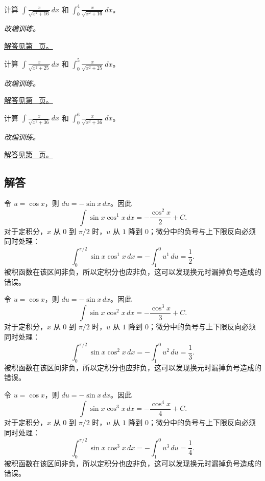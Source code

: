 \documentclass[12pt,fontset=fandol]{ctexart}
\begin{document}
\begin{example}[双曲型根式的直接代换]\label{ex:c14q22}
计算 $\displaystyle\int\frac{x}{\sqrt{x^2+16}}\,dx$ 和 $\displaystyle\int_0^{4}\frac{x}{\sqrt{x^2+16}}\,dx$。
\par\textit{改编训练。}\par\hyperref[ans:c14q22]{解答见第~\pageref{ans:c14q22} 页。}
\end{example}
\begin{example}[双曲型根式的直接代换]\label{ex:c14q23}
计算 $\displaystyle\int\frac{x}{\sqrt{x^2+25}}\,dx$ 和 $\displaystyle\int_0^{5}\frac{x}{\sqrt{x^2+25}}\,dx$。
\par\textit{改编训练。}\par\hyperref[ans:c14q23]{解答见第~\pageref{ans:c14q23} 页。}
\end{example}
\begin{example}[双曲型根式的直接代换]\label{ex:c14q24}
计算 $\displaystyle\int\frac{x}{\sqrt{x^2+36}}\,dx$ 和 $\displaystyle\int_0^{6}\frac{x}{\sqrt{x^2+36}}\,dx$。
\par\textit{改编训练。}\par\hyperref[ans:c14q24]{解答见第~\pageref{ans:c14q24} 页。}
\end{example}
\subsection{解答}
\begin{solve}\label{ans:c14q1}
令 $u=\cos x$，则 $du=-\sin x\,dx$。因此
\[
\int\sin x\cos^{1}x\,dx=-\frac{\cos^{2}x}{2}+C.
\]
对于定积分，$x$ 从 $0$ 到 $\pi/2$ 时，$u$ 从 $1$ 降到 $0$；微分中的负号与上下限反向必须同时处理：
\[
\int_0^{\pi/2}\sin x\cos^{1}x\,dx=-\int_1^0u^{1}\,du=\frac{1}{2}.
\]
被积函数在该区间非负，所以定积分也应非负，这可以发现换元时漏掉负号造成的错误。
\end{solve}

\begin{solve}\label{ans:c14q2}
令 $u=\cos x$，则 $du=-\sin x\,dx$。因此
\[
\int\sin x\cos^{2}x\,dx=-\frac{\cos^{3}x}{3}+C.
\]
对于定积分，$x$ 从 $0$ 到 $\pi/2$ 时，$u$ 从 $1$ 降到 $0$；微分中的负号与上下限反向必须同时处理：
\[
\int_0^{\pi/2}\sin x\cos^{2}x\,dx=-\int_1^0u^{2}\,du=\frac{1}{3}.
\]
被积函数在该区间非负，所以定积分也应非负，这可以发现换元时漏掉负号造成的错误。
\end{solve}

\begin{solve}\label{ans:c14q3}
令 $u=\cos x$，则 $du=-\sin x\,dx$。因此
\[
\int\sin x\cos^{3}x\,dx=-\frac{\cos^{4}x}{4}+C.
\]
对于定积分，$x$ 从 $0$ 到 $\pi/2$ 时，$u$ 从 $1$ 降到 $0$；微分中的负号与上下限反向必须同时处理：
\[
\int_0^{\pi/2}\sin x\cos^{3}x\,dx=-\int_1^0u^{3}\,du=\frac{1}{4}.
\]
被积函数在该区间非负，所以定积分也应非负，这可以发现换元时漏掉负号造成的错误。
\end{solve}
\end{document}
